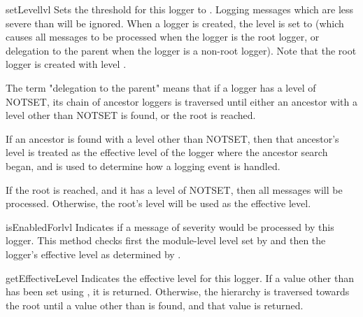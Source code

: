 \begin{methoddesc}{setLevel}{lvl}
Sets the threshold for this logger to . Logging messages
which are less severe than  will be ignored. When a logger is
created, the level is set to  (which causes all messages
to be processed when the logger is the root logger, or delegation to the
parent when the logger is a non-root logger). Note that the root logger
is created with level .

The term "delegation to the parent" means that if a logger has a level
of NOTSET, its chain of ancestor loggers is traversed until either an
ancestor with a level other than NOTSET is found, or the root is
reached.

If an ancestor is found with a level other than NOTSET, then that
ancestor's level is treated as the effective level of the logger where
the ancestor search began, and is used to determine how a logging
event is handled.

If the root is reached, and it has a level of NOTSET, then all
messages will be processed. Otherwise, the root's level will be used
as the effective level.
\end{methoddesc}

\begin{methoddesc}{isEnabledFor}{lvl}
Indicates if a message of severity  would be processed by
this logger.  This method checks first the module-level level set by
 and then the logger's effective level as
determined by .
\end{methoddesc}

\begin{methoddesc}{getEffectiveLevel}{}
Indicates the effective level for this logger. If a value other than
 has been set using , it is returned.
Otherwise, the hierarchy is traversed towards the root until a value
other than  is found, and that value is returned.
\end{methoddesc}

